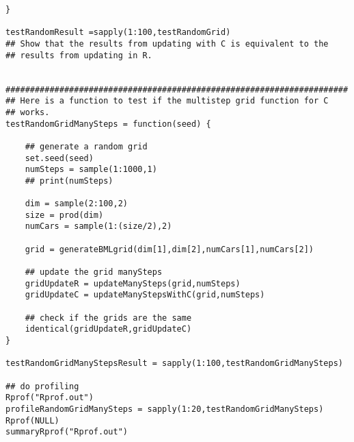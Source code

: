 \documentclass[11pt]{article}
\begin{document}
\begin{verbatim}
}

testRandomResult =sapply(1:100,testRandomGrid)
## Show that the results from updating with C is equivalent to the
## results from updating in R.


######################################################################
## Here is a function to test if the multistep grid function for C
## works.
testRandomGridManySteps = function(seed) {

    ## generate a random grid
    set.seed(seed)
    numSteps = sample(1:1000,1)
    ## print(numSteps)

    dim = sample(2:100,2)
    size = prod(dim)
    numCars = sample(1:(size/2),2)

    grid = generateBMLgrid(dim[1],dim[2],numCars[1],numCars[2])

    ## update the grid manySteps
    gridUpdateR = updateManySteps(grid,numSteps)
    gridUpdateC = updateManyStepsWithC(grid,numSteps)

    ## check if the grids are the same
    identical(gridUpdateR,gridUpdateC)
}

testRandomGridManyStepsResult = sapply(1:100,testRandomGridManySteps)

## do profiling
Rprof("Rprof.out")
profileRandomGridManySteps = sapply(1:20,testRandomGridManySteps)
Rprof(NULL)
summaryRprof("Rprof.out")
\end{verbatim}
\end{document}
